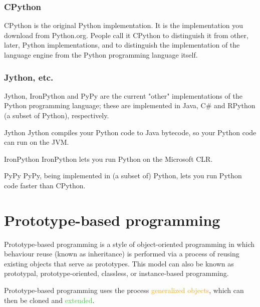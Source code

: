 \documentclass{../py-lecture}
\begin{document}
\begin{frame}
  \frametitle{CPython}
  \begin{block}{}
    CPython is the original Python implementation.
    It is the implementation you download from Python.org.
    People call it CPython to distinguish it from other, later, Python implementations, and to distinguish the implementation of the language engine from the Python programming language itself.
  \end{block}
\end{frame}

\begin{frame}
  \frametitle{Jython, etc.}
  \begin{block}{}
    Jython, IronPython and PyPy are the current "other" implementations of the Python programming language;
    these are implemented in Java, C\# and RPython (a subset of Python), respectively.
  \end{block}
  \begin{block}{Jython}
    Jython compiles your Python code to Java bytecode, so your Python code can run on the JVM.
  \end{block}
  \begin{block}{IronPython}
    IronPython lets you run Python on the Microsoft CLR.
  \end{block}
  \begin{block}{PyPy}
    PyPy, being implemented in (a subset of) Python, lets you run Python code faster than CPython.
  \end{block}
\end{frame}

\section{Prototype-based programming}

\begin{frame}
  \begin{block}{}
    Prototype-based programming is a style of object-oriented programming in which behaviour reuse (known as inheritance) is performed via
    a process of reusing existing objects that serve as prototypes.
    This model can also be known as prototypal, prototype-oriented, classless, or instance-based programming.
  \end{block}
\end{frame}

\begin{frame}
  \begin{block}{}
    Prototype-based programming uses the process \textcolor{Orange}{generalized objects}, which can then be \textcolor{RubineRed}{cloned} and \textcolor{LimeGreen}{extended}.
  \end{block}
\end{frame}
\end{document}
